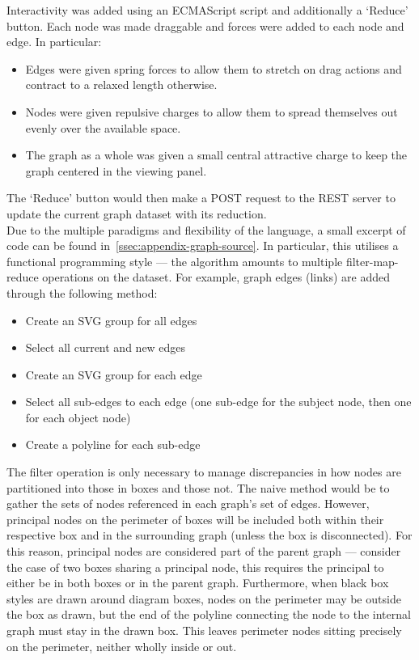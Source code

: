         Interactivity was added using an ECMAScript script and additionally a `Reduce' button.
        Each node was made draggable and forces were added to each node and edge.
        In particular:
        \begin{itemize}
            \item Edges were given spring forces to allow them to stretch on drag actions and contract to a relaxed length otherwise.
            \item Nodes were given repulsive charges to allow them to spread themselves out evenly over the available space.
            \item The graph as a whole was given a small central attractive charge to keep the graph centered in the viewing panel.
        \end{itemize}
        The `Reduce' button would then make a POST request to the REST server to update the current graph dataset with its reduction.\\

        Due to the multiple paradigms and flexibility of the language, a small excerpt of code can be found in~\ref{ssec:appendix-graph-source}.
        In particular, this utilises a functional programming style --- the algorithm amounts to multiple filter-map-reduce operations on the dataset.
        For example, graph edges (links) are added through the following method:
        \begin{itemize}
            \item Create an SVG group for all edges
            \item Select all current and new edges
            \item Create an SVG group for each edge
            \item Select all sub-edges to each edge (one sub-edge for the subject node, then one for each object node)
            \item Create a polyline for each sub-edge
        \end{itemize}

        The filter operation is only necessary to manage discrepancies in how nodes are partitioned into those in boxes and those not.
        The naive method would be to gather the sets of nodes referenced in each graph's set of edges.
        However, principal nodes on the perimeter of boxes will be included both within their respective box and in the surrounding graph (unless the box is disconnected).
        For this reason, principal nodes are considered part of the parent graph --- consider the case of two boxes sharing a principal node, this requires the principal to either be in both boxes or in the parent graph.
        Furthermore, when black box styles are drawn around diagram boxes, nodes on the perimeter may be outside the box as drawn, but the end of the polyline connecting the node to the internal graph must stay in the drawn box.
        This leaves perimeter nodes sitting precisely on the perimeter, neither wholly inside or out.\\

